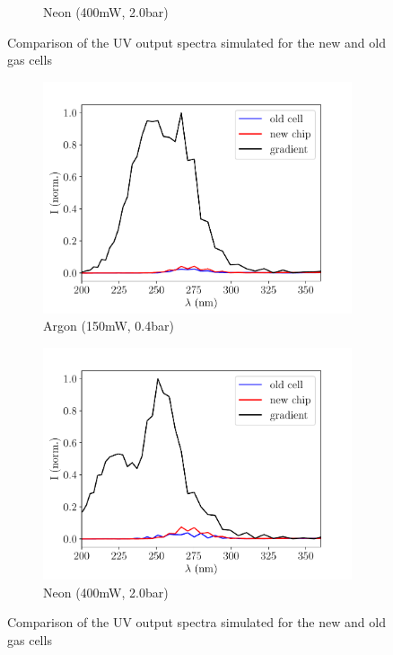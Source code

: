 \documentclass[a4paper]{jpconf}
\begin{document}
\begin{figure}[h]
\begin{subfigure}{0.5\textwidth}
\caption{Neon (400mW, 2.0bar)}\label{im:coms_Ne}
\end{subfigure}
\caption{Comparison of the UV output spectra simulated for the new and old gas cells}\label{im:coms}
\end{figure}


\begin{figure}[h]
\centering
 \begin{subfigure}{0.5\textwidth}
\includegraphics[width=\textwidth]{im/Ar_old_v_new_v_grad}
\caption{Argon (150mW, 0.4bar)}\label{im:coms_Ar}
\end{subfigure}
 \begin{subfigure}{0.5\textwidth}
\includegraphics[width=\textwidth]{im/Ne_old_v_new_v_grad}
\caption{Neon (400mW, 2.0bar)}\label{im:coms_Ne}
\end{subfigure}
\caption{Comparison of the UV output spectra simulated for the new and old gas cells}\label{im:coms}
\end{figure}
\end{document}

